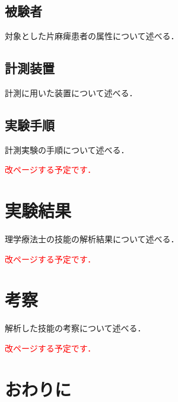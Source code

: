 \subsection{被験者}
\label{subsec:subject_chap4}
対象とした片麻痺患者の属性について述べる．

\subsection{計測装置}
\label{subsec:device_chap4}
計測に用いた装置について述べる．

\subsection{実験手順}
\label{subsec:method_chap4}
計測実験の手順について述べる．

\textcolor{red}{改ページする予定です．}
\section{実験結果}
\label{sec:result_chap4}

理学療法士の技能の解析結果について述べる．

\textcolor{red}{改ページする予定です．}
\section{考察}
\label{sec:discussion_chap4}

解析した技能の考察について述べる．

\textcolor{red}{改ページする予定です．}
\section{おわりに}
\label{sec:outro_chap4}

